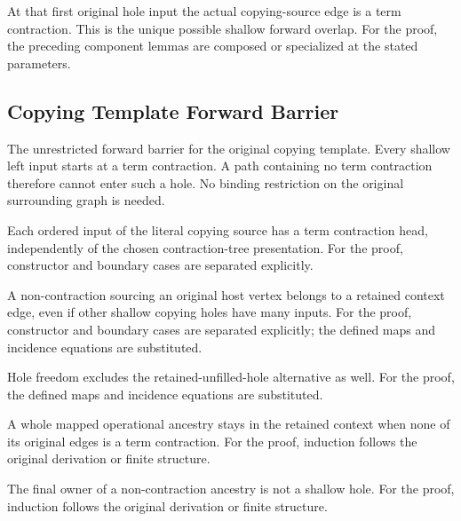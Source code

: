 At that first original hole input the actual copying-source edge is a term contraction. This is the unique possible shallow forward overlap.
For the proof, the preceding component lemmas are composed or specialized at the stated parameters.
\par{}

\subsection{Copying Template Forward Barrier}
The unrestricted forward barrier for the original copying template. Every shallow left input starts at a term contraction. A path containing no term contraction therefore cannot enter such a hole. No binding restriction on the original surrounding graph is needed.

Each ordered input of the literal copying source has a term contraction head, independently of the chosen contraction-tree presentation.
For the proof, constructor and boundary cases are separated explicitly.
\par{}

A non-contraction sourcing an original host vertex belongs to a retained context edge, even if other shallow copying holes have many inputs.
For the proof, constructor and boundary cases are separated explicitly; the defined maps and incidence equations are substituted.
\par{}

Hole freedom excludes the retained-unfilled-hole alternative as well.
For the proof, the defined maps and incidence equations are substituted.
\par{}

A whole mapped operational ancestry stays in the retained context when none of its original edges is a term contraction.
For the proof, induction follows the original derivation or finite structure.
\par{}

The final owner of a non-contraction ancestry is not a shallow hole.
For the proof, induction follows the original derivation or finite structure.
\par{}

